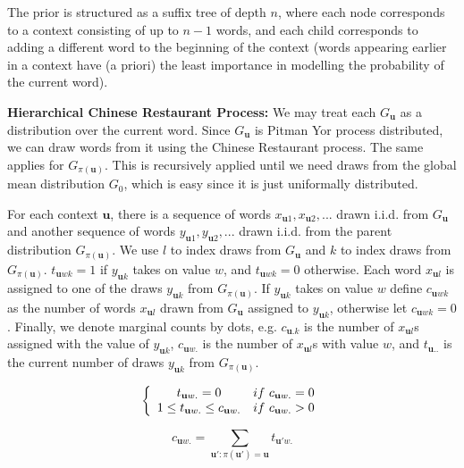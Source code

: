 The prior is structured as a suffix tree of depth $n$, where each node corresponds to a context consisting of up to $n-1$ words, and each child corresponds to adding a different word to the beginning of the context (words appearing earlier in a context have (a priori) the least importance in modelling the probability of the current word).

\textbf{Hierarchical Chinese Restaurant Process:} We may treat each $G_{\textbf{u}}$ as a distribution over the current word. Since $G_{\textbf{u}}$ is Pitman Yor process distributed, we can draw words from it using the Chinese Restaurant process. The same applies for $G_{\pi(\textbf{u})}$. This is recursively applied until we need draws from the global mean distribution $G_{0}$, which is easy since it is just uniformally distributed.

For each context $\textbf{u}$, there is a sequence of words $x_{\textbf{u}1}, x_{\textbf{u}2}, ...$ drawn i.i.d. from $G_{\textbf{u}}$ and another sequence of words $y_{\textbf{u}1}, y_{\textbf{u}2}, ...$ drawn i.i.d. from the parent distribution $G_{\pi(\textbf{u})}$. We use $l$ to index draws from $G_{\textbf{u}}$ and $k$ to index draws from $G_{\pi(\textbf{u})}$. $t_{\textbf{u}wk}=1$ if $y_{\textbf{u}k}$ takes on value $w$, and $t_{\textbf{u}wk}=0$ otherwise. Each word $x_{\textbf{u}l}$ is assigned to one of the draws $y_{\textbf{u}k}$ from $G_{\pi(\textbf{u})}$. If $y_{\textbf{u}k}$ takes on value $w$ define $c_{\textbf{u}wk}$ as the number of words $x_{\textbf{u}l}$ drawn from $G_{\textbf{u}}$ assigned to $y_{\textbf{u}k}$, otherwise let $c_{\textbf{u}wk}=0$. Finally, we denote marginal counts by dots, e.g. $c_{\textbf{u}.k}$ is the number of $x_{\textbf{u}l}$s assigned with the value of $y_{\textbf{u}k}$, $c_{\textbf{u}w.}$ is the number of $x_{\textbf{u}l}$s with value $w$, and $t_{\textbf{u}..}$ is the current number of draws $y_{\textbf{u}k}$ from $G_{\pi(\textbf{u})}$.

\begin{equation}
\left \{ \begin{array} {c c} t_{\textbf{u}w.}=0 & if\ c_{\textbf{u}w.}=0 \\
1\leq t_{\textbf{u}w.} \leq c_{\textbf{u}w.} & if\ c_{\textbf{u}w.}>0
\end{array}
\right.
\label{eq:hierarchicalChineseRestaurantT}
\end{equation}

\begin{equation}
c_{\textbf{u}w.}=\sum _{\textbf{u}':\pi (\textbf{u}')=\textbf{u}}t_{\textbf{u}'w.}
\label{eq:hierarchicalChineseRestaurantC}
\end{equation}

